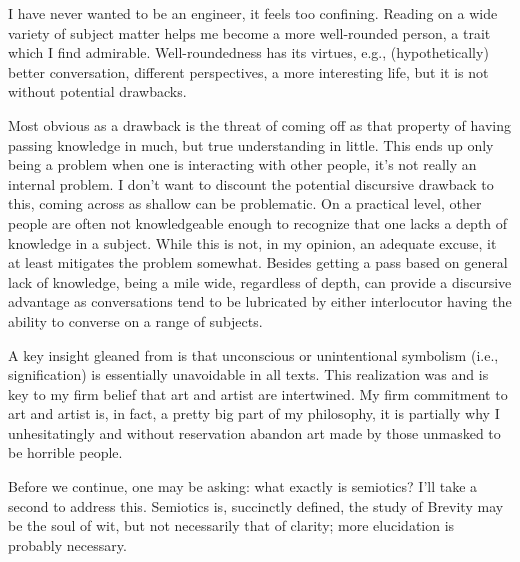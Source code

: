 \documentclass[../butidigress.tex]{subfiles}
\begin{document}
I have never wanted to be  an engineer, it feels too confining.
Reading on a wide variety of subject matter helps me become a more well-rounded person, a trait which I find admirable.
Well-roundedness has its virtues, e.g., (hypothetically) better conversation, different perspectives, a more interesting life, but it is not without potential drawbacks.

Most obvious as a drawback is the threat of coming off as  that property of having passing knowledge in much, but true understanding in little.
This ends up only being a problem when one is interacting with other people, it's not really an internal problem.
I don't want to discount the potential discursive drawback to this, coming across as shallow can be problematic.
On a practical level, other people are often not knowledgeable enough to recognize that one lacks a depth of knowledge in a subject.
While this is not, in my opinion, an adequate excuse, it at least mitigates the problem somewhat.
Besides getting a pass based on general lack of knowledge, being a mile wide, regardless of depth, can provide a discursive advantage as conversations tend to be lubricated by either interlocutor having the ability to converse on a range of subjects.

A key insight gleaned from  is that unconscious or unintentional symbolism (i.e., signification) is essentially unavoidable in all texts.
This realization was and is key to my firm belief that art and artist are intertwined.
My firm commitment to art and artist is, in fact, a pretty big part of my philosophy, it is partially why I unhesitatingly and without reservation abandon art made by those unmasked to be horrible people.

Before we continue, one may be asking: what exactly is semiotics? I'll take a second to address this.
Semiotics is, succinctly defined, the study of 
Brevity may be the soul of wit, but not necessarily that of clarity; more elucidation is probably necessary.
\end{document}
